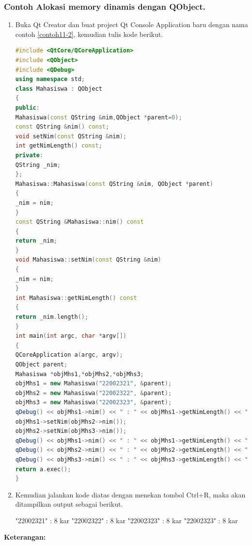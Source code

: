 \subsubsection*{Contoh  Alokasi memory dinamis dengan QObject.}

\begin{enumerate}

\item
  Buka Qt Creator dan buat project Qt Console Application baru dengan
  nama contoh \ref{contoh11-2}, kemudian tulis kode berikut.

\begin{lstlisting}[language=c++, caption=Alokasi memory dinamis dengan QObject, label=contoh11-2]
#include <QtCore/QCoreApplication>
#include <QObject>
#include <QDebug>
using namespace std;
class Mahasiswa : QObject
{
public:
Mahasiswa(const QString &nim,QObject *parent=0);
const QString &nim() const;
void setNim(const QString &nim);
int getNimLength() const;
private:
QString _nim;
};
Mahasiswa::Mahasiswa(const QString &nim, QObject *parent)
{
_nim = nim;
}
const QString &Mahasiswa::nim() const
{
return _nim;
}
void Mahasiswa::setNim(const QString &nim)
{
_nim = nim;
}
int Mahasiswa::getNimLength() const
{
return _nim.length();
}
int main(int argc, char *argv[])
{
QCoreApplication a(argc, argv);
QObject parent;
Mahasiswa *objMhs1,*objMhs2,*objMhs3;
objMhs1 = new Mahasiswa("22002321", &parent);
objMhs2 = new Mahasiswa("22002322", &parent);
objMhs3 = new Mahasiswa("22002323", &parent);
qDebug() << objMhs1->nim() << " : " << objMhs1->getNimLength() << " kar";
objMhs1->setNim(objMhs2->nim());
objMhs2->setNim(objMhs3->nim());
qDebug() << objMhs1->nim() << " : " << objMhs1->getNimLength() << " kar";
qDebug() << objMhs2->nim() << " : " << objMhs2->getNimLength() << " kar";
qDebug() << objMhs3->nim() << " : " << objMhs3->getNimLength() << " kar";
return a.exec();
}
\end{lstlisting}
\item
  Kemudian jalankan kode diatas dengan menekan tombol Ctrl+R, maka akan
  ditampilkan output sebagai berikut.

\begin{lcverbatim}
"22002321"  :  8  kar
"22002322"  :  8  kar
"22002323"  :  8  kar
"22002323"  :  8  kar
\end{lcverbatim}
\end{enumerate}

\textbf{Keterangan:}

